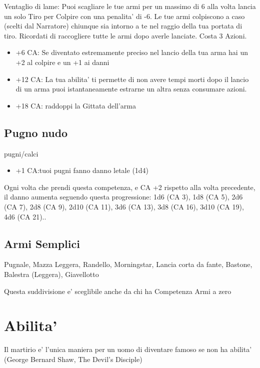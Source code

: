 \documentclass[a4paper,11pt,twoside,openany]{dndbook}
\begin{document}
Ventaglio di lame: Puoi scagliare le tue armi per un massimo di 6 alla volta lancia un solo Tiro per Colpire con una penalita' di -6. Le tue armi colpiscono a caso (scelti dal Narratore) chiunque sia intorno a te nel raggio della tua portata di tiro. Ricordati di raccogliere tutte le armi dopo averle lanciate. Costa 3 Azioni.

\begin{itemize}
\item +6 CA: Se diventato estremamente preciso nel lancio della tua arma hai un +2 al colpire e un +1 ai danni

\item +12 CA: La tua abilita' ti permette di non avere tempi morti dopo il lancio di un arma puoi istantaneamente estrarne un altra senza consumare azioni.

\item +18 CA: raddoppi la Gittata dell'arma
\end{itemize}

\subsection{Pugno nudo} pugni/calci

\begin{itemize}
	\item +1 CA:tuoi pugni fanno danno letale (1d4)
\end{itemize}

Ogni volta che prendi questa competenza, e CA +2 rispetto alla volta precedente, il danno aumenta seguendo questa progressione: 1d6 (CA 3), 1d8 (CA 5), 2d6 (CA 7), 2d8 (CA 9), 2d10 (CA 11), 3d6 (CA 13), 3d8 (CA 16), 3d10 (CA 19), 4d6 (CA 21)..

\subsection{Armi Semplici} Pugnale, Mazza Leggera, Randello, Morningstar, Lancia corta da fante, Bastone, Balestra (Leggera), Giavellotto

Questa suddivisione e' sceglibile anche da chi ha Competenza Armi a zero 

\pagebreak

\section{Abilita'}

\label{abilita}
\begin{quotebox}
Il martirio e' l'unica maniera per un uomo di diventare famoso se non ha abilita' (George Bernard Shaw, The Devil's Disciple)
\end{quotebox}
\end{document}

